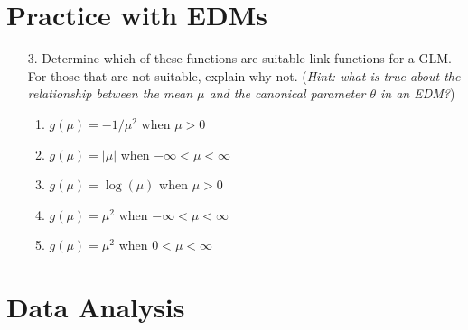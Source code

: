 \documentclass[11pt]{article}
\begin{document}
\newpage

\section*{Practice with EDMs}

\begin{enumerate}
\item[3.] Determine which of these functions are suitable link functions for a GLM. For those that are not suitable, explain why not. (\textit{Hint: what is true about the relationship between the mean $\mu$ and the canonical parameter $\theta$ in an EDM?})

\begin{enumerate}
\item $g(\mu) = -1/\mu^2$ when $\mu > 0$
\item $g(\mu) = |\mu|$ when $-\infty < \mu < \infty$
\item $g(\mu) = \log(\mu)$ when $\mu > 0$
\item $g(\mu) = \mu^2$ when $-\infty < \mu < \infty$
\item $g(\mu) = \mu^2$ when $0 < \mu < \infty$
\end{enumerate}


\end{enumerate}

\section*{Data Analysis}
\end{document}
